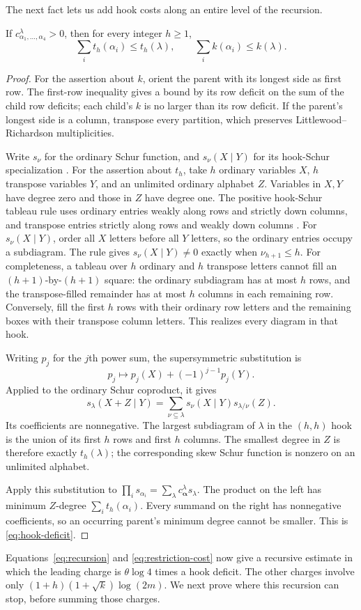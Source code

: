 The next fact lets us add hook costs along an entire level of the recursion.

\begin{lemma}\label{lem:hook-deficit}
If $c^{\lambda}_{\alpha_1,\ldots,\alpha_4}>0$, then for every integer $h\ge1$,
\begin{equation}\label{eq:hook-deficit}
 \sum_i t_h(\alpha_i)\le t_h(\lambda),
 \qquad \sum_i k(\alpha_i)\le k(\lambda).
\end{equation}
\end{lemma}
\begin{proof}
For the assertion about $k$, orient the parent with its longest side as first row. The first-row inequality gives a bound by its row deficit on the sum of the child row deficits; each child's $k$ is no larger than its row deficit. If the parent's longest side is a column, transpose every partition, which preserves Littlewood--Richardson multiplicities.

Write $s_\nu$ for the ordinary Schur function, and $s_\nu(X\mid Y)$ for its hook-Schur specialization \cite[Definition~1(a)]{orellana-zabrocki2000}. For the assertion about $t_h$, take $h$ ordinary variables $X$, $h$ transpose variables $Y$, and an unlimited ordinary alphabet $Z$. Variables in $X,Y$ have degree zero and those in $Z$ have degree one. The positive hook-Schur tableau rule uses ordinary entries weakly along rows and strictly down columns, and transpose entries strictly along rows and weakly down columns \cite[Section~2]{mason-niese2016}. For $s_\nu(X\mid Y)$, order all $X$ letters before all $Y$ letters, so the ordinary entries occupy a subdiagram. The rule gives
$s_\nu(X\mid Y)\ne0$ exactly when $\nu_{h+1}\le h$.
For completeness, a tableau over $h$ ordinary and $h$ transpose letters cannot fill an $(h+1)$-by-$(h+1)$ square: the ordinary subdiagram has at most $h$ rows, and the transpose-filled remainder has at most $h$ columns in each remaining row. Conversely, fill the first $h$ rows with their ordinary row letters and the remaining boxes with their transpose column letters. This realizes every diagram in that hook.

Writing $p_j$ for the $j$th power sum, the supersymmetric substitution is
\[
 p_j\longmapsto p_j(X)+(-1)^{j-1}p_j(Y).
\]
Applied to the ordinary Schur coproduct, it gives
\[
 s_\lambda(X+Z\mid Y)
 =\sum_{\nu\subseteq\lambda}s_\nu(X\mid Y)s_{\lambda/\nu}(Z).
\]
Its coefficients are nonnegative. The largest subdiagram of $\lambda$ in the $(h,h)$ hook is the union of its first $h$ rows and first $h$ columns. The smallest degree in $Z$ is therefore exactly $t_h(\lambda)$; the corresponding skew Schur function is nonzero on an unlimited alphabet.

Apply this substitution to
$\prod_i s_{\alpha_i}=\sum_\lambda c^{\lambda}_{\boldsymbol\alpha}s_\lambda$.
The product on the left has minimum $Z$-degree $\sum_i t_h(\alpha_i)$. Every summand on the right has nonnegative coefficients, so an occurring parent's minimum degree cannot be smaller. This is \eqref{eq:hook-deficit}.
\end{proof}

Equations~\eqref{eq:recursion} and \eqref{eq:restriction-cost} now give a recursive estimate in which the leading charge is $\theta\log4$ times a hook deficit. The other charges involve only $(1+h)(1+\sqrt k)\log(2m)$. We next prove where this recursion can stop, before summing those charges.
